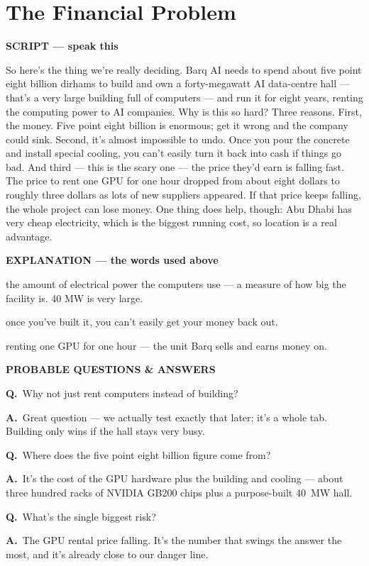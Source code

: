 \documentclass[12pt,a4paper]{article}
\newcommand{\block}[2]{\par\medskip\noindent\textcolor{#1}{\textbf{#2}}\par\nobreak\smallskip}
\newcommand{\SC}{\block{tvblue}{SCRIPT --- speak this}}
\newcommand{\EX}{\block{tvgreen}{EXPLANATION --- the words used above}}
\newcommand{\PQ}{\block{tvamber}{PROBABLE QUESTIONS \& ANSWERS}}
\newcommand{\qa}[2]{\par\noindent\textbf{Q.}~#1\par\noindent\textbf{A.}~#2\par\smallskip}
\newenvironment{terms}{\begin{description}[leftmargin=0pt,itemsep=2pt,font=\normalfont\bfseries]}{\end{description}}
\begin{document}
\section{The Financial Problem}

\SC
So here's the thing we're really deciding. Barq AI needs to spend about five point eight billion
dirhams to build and own a forty-megawatt AI data-centre hall --- that's a very large building full of
computers --- and run it for eight years, renting the computing power to AI companies. Why is this so
hard? Three reasons. First, the money. Five point eight billion is enormous; get it wrong and the
company could sink. Second, it's almost impossible to undo. Once you pour the concrete and install
special cooling, you can't easily turn it back into cash if things go bad. And third --- this is the
scary one --- the price they'd earn is falling fast. The price to rent one GPU for one hour dropped
from about eight dollars to roughly three dollars as lots of new suppliers appeared. If that price
keeps falling, the whole project can lose money. One thing does help, though: Abu Dhabi has very cheap
electricity, which is the biggest running cost, so location is a real advantage.

\EX
\begin{terms}
  \item[40 megawatts (MW):] the amount of electrical power the computers use --- a measure of how big
  the facility is. 40 MW is very large.
  \item[Irreversible:] once you've built it, you can't easily get your money back out.
  \item[GPU-hour:] renting one GPU for one hour --- the unit Barq sells and earns money on.
\end{terms}

\PQ
\qa{Why not just rent computers instead of building?}{Great question --- we actually test exactly that
later; it's a whole tab. Building only wins if the hall stays very busy.}
\qa{Where does the five point eight billion figure come from?}{It's the cost of the GPU hardware plus
the building and cooling --- about three hundred racks of NVIDIA GB200 chips plus a purpose-built
40~MW hall.}
\qa{What's the single biggest risk?}{The GPU rental price falling. It's the number that swings the
answer the most, and it's already close to our danger line.}

\end{document}

